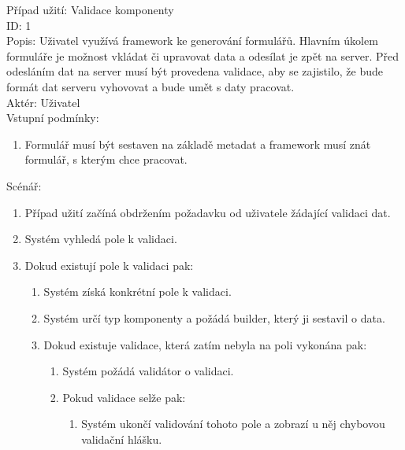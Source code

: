 Případ užití: Validace komponenty\\
ID: 1\\
Popis: 
Uživatel využívá framework ke generování formulářů. Hlavním úkolem formuláře je možnost vkládat či upravovat data a odesílat je zpět na server. Před odesláním dat na server musí být provedena validace, aby se zajistilo, že bude formát dat serveru vyhovovat a bude umět s daty pracovat.
\\
Aktér: Uživatel\\
Vstupní podmínky:
\begin{enumerate}
\item Formulář musí být sestaven na základě metadat a framework musí znát formulář, s kterým chce pracovat.
\end{enumerate}
Scénář:
\begin{enumerate}
\item Případ užití začíná obdržením požadavku od uživatele žádající validaci dat.
\item Systém vyhledá pole k validaci.
\item Dokud existují pole k validaci pak:
\begin{enumerate}
\item Systém získá konkrétní pole k validaci.
\item Systém určí typ komponenty a požádá builder, který ji sestavil o data.
\item Dokud existuje validace, která zatím nebyla na poli vykonána pak:
\begin{enumerate}
\item Systém požádá validátor o validaci.
\item Pokud validace selže pak:
\begin{enumerate}
\item Systém ukončí validování tohoto pole a zobrazí u něj chybovou validační hlášku.
\end{enumerate}
\end{enumerate}
\end{enumerate}
\end{enumerate}

